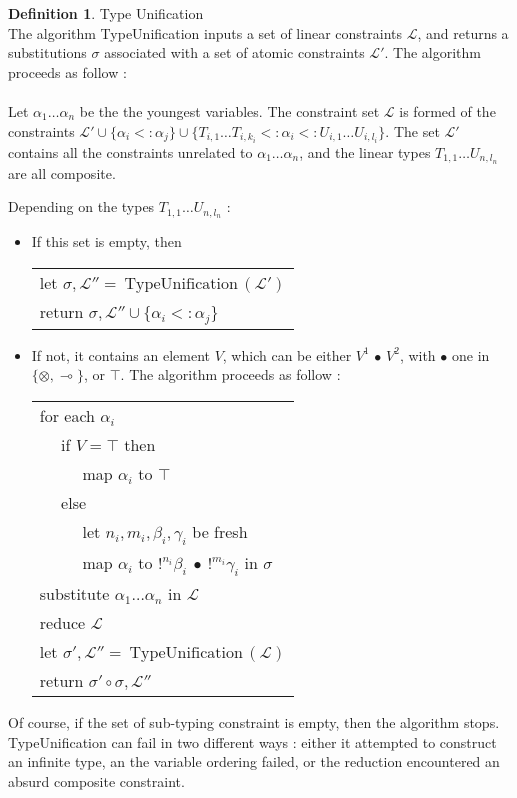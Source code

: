 \documentclass[10pt]{article}
\theoremstyle{plain}
\theoremstyle{definition}
\newtheorem{defn}{Definition}[subsection] %
\begin{document}
\begin{defn}{Type Unification} \\
	The algorithm TypeUnification inputs a set of linear constraints $\mathcal{L}$, and returns
	a substitutions $\sigma$ associated with a set of atomic constraints $\mathcal{L'}$.
	The algorithm proceeds as follow : \\
	\\
  Let $\alpha_1 \dots \alpha_n$ be the the youngest variables. The constraint set $\mathcal{L}$ is formed of the constraints
  $\mathcal{L'} \cup \{ \alpha_i <: \alpha_j \} \cup \{ T_{i, 1} \dots T_{i, k_i} <: \alpha_i <: U_{i, 1} \dots U_{i, l_i} \}$.
  The set $\mathcal{L'}$ contains all the constraints unrelated to $\alpha_1 \dots \alpha_n$,
  and the linear types $T_{1, 1} \dots U_{n, l_n}$ are all composite.
  		
  Depending on the types $T_{1, 1} \dots U_{n, l_n}$ :
	\begin{itemize}
		\item If this set is empty, then \\
			\begin{tabular}{l}
				let $\sigma, \mathcal{L''} = ~\text{TypeUnification}\,(\mathcal{L'})$ \\
				return $\sigma, \mathcal{L''} \cup \{ \alpha_i <: \alpha_j \}$
			\end{tabular}
	  
	  \item If not, it contains an element $V$, which can be either $V^1 \,\bullet \, V^2$, with $\bullet$ one in $\{ \otimes, \multimap \}$, or
	  	$\top$. The algorithm proceeds as follow :\\
	  	\begin{tabular}{l}
	  		for each $\alpha_i$ \\
	  		~~ if $V = \top$ then \\
	  		~~ ~~ map $\alpha_i$ to $\top$ \\
	  		~~ else \\
	  		~~ ~~ let $n_i, m_i, \beta_i, \gamma_i$ be fresh \\
	  		~~ ~~ map $\alpha_i$ to $!^{n_i} \beta_i ~\bullet~ !^{m_i}\gamma_i$ in $\sigma$ \\
	  		substitute $\alpha_1 \dots \alpha_n$ in $\mathcal{L}$ \\
	  		reduce $\mathcal{L}$ \\
	  		let $\sigma', \mathcal{L''} = ~\text{TypeUnification}\,(\mathcal{L})$ \\
	  		return $\sigma' \circ \sigma, \mathcal{L''}$
	  	\end{tabular}
  \end{itemize}

  Of course, if the set of sub-typing constraint is empty, then the algorithm stops.
  TypeUnification can fail in two different ways : either it attempted to construct an infinite
  type, an the variable ordering failed, or the reduction encountered an absurd composite constraint.
\end{defn}
\end{document}
